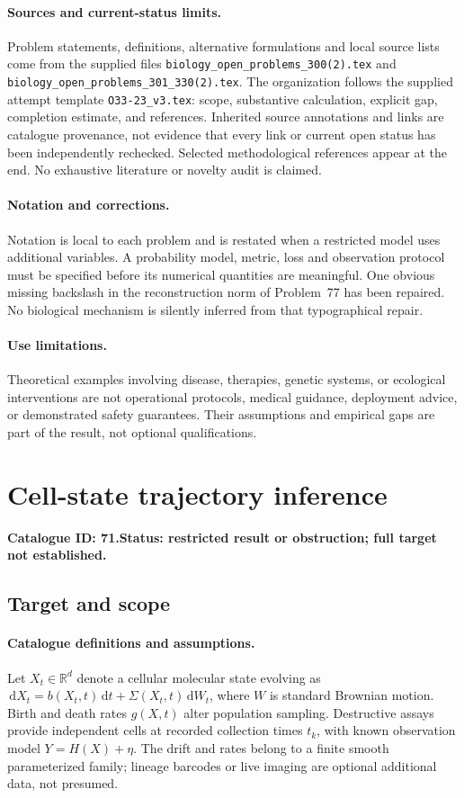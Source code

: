 \documentclass[11pt]{article}
\newcommand{\R}{\mathbb R}
\newcommand{\dd}{\,\mathrm d}
\providecommand{\R}{\mathbb R}
\begin{document}
\paragraph{Sources and current-status limits.}
Problem statements, definitions, alternative formulations and local source lists
come from the supplied files
\texttt{biology\_open\_problems\_300(2).tex} and
\texttt{biology\_open\_problems\_301\_330(2).tex}.
The organization follows the supplied attempt template
\texttt{O33-23\_v3.tex}: scope, substantive calculation, explicit gap,
completion estimate, and references. Inherited source annotations and links are
catalogue provenance, not evidence that every link or current open status has
been independently rechecked. Selected methodological references appear at the
end. No exhaustive literature or novelty audit is claimed.

\paragraph{Notation and corrections.}
Notation is local to each problem and is restated when a restricted model uses
additional variables. A probability model, metric, loss and observation protocol
must be specified before its numerical quantities are meaningful. One obvious
missing backslash in the reconstruction norm of Problem~77 has been repaired.
No biological mechanism is silently inferred from that typographical repair.

\paragraph{Use limitations.}
Theoretical examples involving disease, therapies, genetic systems, or ecological
interventions are not operational protocols, medical guidance, deployment advice,
or demonstrated safety guarantees. Their assumptions and empirical gaps are part
of the result, not optional qualifications.

\setcounter{section}{70}
\section{Cell-state trajectory inference}
\label{prob:071}
\noindent\textbf{Catalogue ID: 71.}\quad \textbf{Status: restricted result or obstruction; full target not established.}
\subsection{Target and scope}
\paragraph{Catalogue definitions and assumptions.}
Let $X_t\in\R^d$ denote a cellular molecular state evolving as $\dd X_t=b(X_t,t)\dd t+\Sigma(X_t,t)\dd W_t$, where $W$ is standard Brownian motion. Birth and death rates $g(X,t)$ alter population sampling. Destructive assays provide independent cells at recorded collection times $t_k$, with known observation model $Y=H(X)+\eta$. The drift and rates belong to a finite smooth parameterized family; lineage barcodes or live imaging are optional additional data, not presumed.
\end{document}
